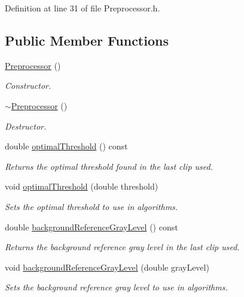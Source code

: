 Definition at line 31 of file Preprocessor.h.\subsection*{Public Member Functions}
\begin{CompactItemize}
\item 
\hyperlink{class_preprocessor_da966c8b83e7c3bcd8759549c3cdf688}{Preprocessor} ()
\begin{CompactList}\small\item\em Constructor. \item\end{CompactList}\item 
\hyperlink{class_preprocessor_3c16724bc9e18b12a45f5a7fe2752b1b}{$\sim$Preprocessor} ()
\begin{CompactList}\small\item\em Destructor. \item\end{CompactList}\item 
double \hyperlink{class_preprocessor_8cc19d799c87198f97356d41606aa4ac}{optimalThreshold} () const 
\begin{CompactList}\small\item\em Returns the optimal threshold found in the last clip used. \item\end{CompactList}\item 
void \hyperlink{class_preprocessor_18a36d341721334d6bd045f2ce1b1538}{optimalThreshold} (double threshold)
\begin{CompactList}\small\item\em Sets the optimal threshold to use in algorithms. \item\end{CompactList}\item 
double \hyperlink{class_preprocessor_159a9059fc811585eb9363e76ad16148}{backgroundReferenceGrayLevel} () const 
\begin{CompactList}\small\item\em Returns the background reference gray level in the last clip used. \item\end{CompactList}\item 
void \hyperlink{class_preprocessor_86d53fb28912d95eea53823a57772c54}{backgroundReferenceGrayLevel} (double grayLevel)
\begin{CompactList}\small\item\em Sets the background reference gray level to use in algorithms. \item\end{CompactList}\item 

\end{CompactItemize}

